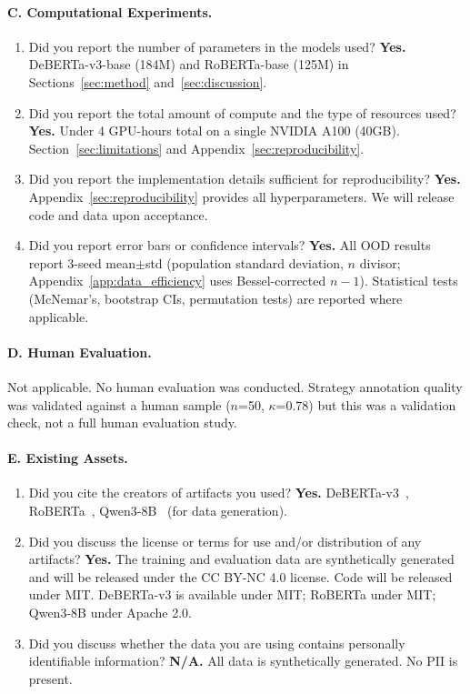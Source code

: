 \paragraph{C. Computational Experiments.}
\begin{enumerate}[label=C\arabic*.,leftmargin=2em]
  \item Did you report the number of parameters in the models used? \textbf{Yes.} DeBERTa-v3-base (184M) and RoBERTa-base (125M) in Sections~\ref{sec:method} and~\ref{sec:discussion}.
  \item Did you report the total amount of compute and the type of resources used? \textbf{Yes.} Under 4 GPU-hours total on a single NVIDIA A100 (40GB). Section~\ref{sec:limitations} and Appendix~\ref{sec:reproducibility}.
  \item Did you report the implementation details sufficient for reproducibility? \textbf{Yes.} Appendix~\ref{sec:reproducibility} provides all hyperparameters. We will release code and data upon acceptance.
  \item Did you report error bars or confidence intervals? \textbf{Yes.} All OOD results report 3-seed mean$\pm$std (population standard deviation, $n$ divisor; Appendix~\ref{app:data_efficiency} uses Bessel-corrected $n{-}1$). Statistical tests (McNemar's, bootstrap CIs, permutation tests) are reported where applicable.
\end{enumerate}

\paragraph{D. Human Evaluation.}
Not applicable. No human evaluation was conducted. Strategy annotation quality was validated against a human sample ($n$=50, $\kappa$=0.78) but this was a validation check, not a full human evaluation study.

\paragraph{E. Existing Assets.}
\begin{enumerate}[label=E\arabic*.,leftmargin=2em]
  \item Did you cite the creators of artifacts you used? \textbf{Yes.} DeBERTa-v3~\citep{he2023debertav3}, RoBERTa~\citep{liu2019roberta}, Qwen3-8B~\citep{qwen3_2025} (for data generation).
  \item Did you discuss the license or terms for use and/or distribution of any artifacts? \textbf{Yes.} The training and evaluation data are synthetically generated and will be released under the CC BY-NC 4.0 license. Code will be released under MIT. DeBERTa-v3 is available under MIT; RoBERTa under MIT; Qwen3-8B under Apache 2.0.
  \item Did you discuss whether the data you are using contains personally identifiable information? \textbf{N/A.} All data is synthetically generated. No PII is present.
\end{enumerate}

